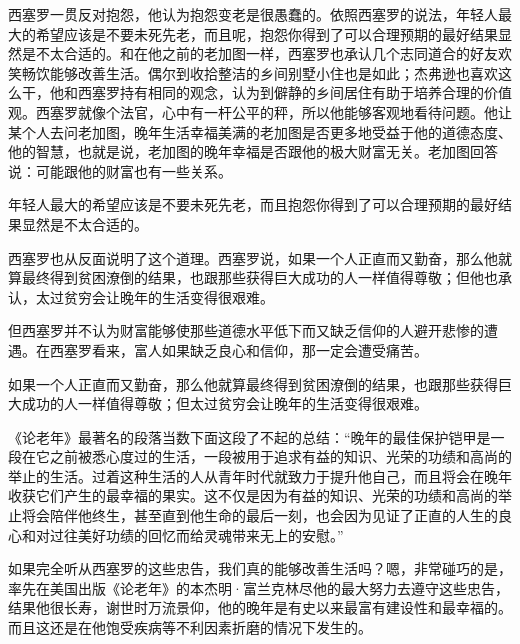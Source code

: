西塞罗一贯反对抱怨，他认为抱怨变老是很愚蠢的。依照西塞罗的说法，年轻人最大的希望应该是不要未死先老，而且呢，抱怨你得到了可以合理预期的最好结果显然是不太合适的。和在他之前的老加图一样，西塞罗也承认几个志同道合的好友欢笑畅饮能够改善生活。偶尔到收拾整洁的乡间别墅小住也是如此；杰弗逊也喜欢这么干，他和西塞罗持有相同的观念，认为到僻静的乡间居住有助于培养合理的价值观。西塞罗就像个法官，心中有一杆公平的秤，所以他能够客观地看待问题。他让某个人去问老加图，晚年生活幸福美满的老加图是否更多地受益于他的道德态度、他的智慧，也就是说，老加图的晚年幸福是否跟他的极大财富无关。老加图回答说：可能跟他的财富也有一些关系。
\par

\begin{WisdomBox}
\par

年轻人最大的希望应该是不要未死先老，而且抱怨你得到了可以合理预期的最好结果显然是不太合适的。
\par
\end{WisdomBox}

西塞罗也从反面说明了这个道理。西塞罗说，如果一个人正直而又勤奋，那么他就算最终得到贫困潦倒的结果，也跟那些获得巨大成功的人一样值得尊敬；但他也承认，太过贫穷会让晚年的生活变得很艰难。
\par

但西塞罗并不认为财富能够使那些道德水平低下而又缺乏信仰的人避开悲惨的遭遇。在西塞罗看来，富人如果缺乏良心和信仰，那一定会遭受痛苦。
\par

\begin{WisdomBox}
\par

如果一个人正直而又勤奋，那么他就算最终得到贫困潦倒的结果，也跟那些获得巨大成功的人一样值得尊敬；但太过贫穷会让晚年的生活变得很艰难。
\par
\end{WisdomBox}

《论老年》最著名的段落当数下面这段了不起的总结：“晚年的最佳保护铠甲是一段在它之前被悉心度过的生活，一段被用于追求有益的知识、光荣的功绩和高尚的举止的生活。过着这种生活的人从青年时代就致力于提升他自己，而且将会在晚年收获它们产生的最幸福的果实。这不仅是因为有益的知识、光荣的功绩和高尚的举止将会陪伴他终生，甚至直到他生命的最后一刻，也会因为见证了正直的人生的良心和对过往美好功绩的回忆而给灵魂带来无上的安慰。”
\par

如果完全听从西塞罗的这些忠告，我们真的能够改善生活吗？嗯，非常碰巧的是，率先在美国出版《论老年》的本杰明·富兰克林尽他的最大努力去遵守这些忠告，结果他很长寿，谢世时万流景仰，他的晚年是有史以来最富有建设性和最幸福的。而且这还是在他饱受疾病等不利因素折磨的情况下发生的。
\par

